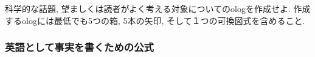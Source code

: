 \begin{exercise}

科学的な話題, 望ましくは読者がよく考える対象についてのologを作成せよ. 作成するologには最低でも5つの箱, 5本の矢印, そして１つの可換図式を含めること.
\end{exercise}


\subsubsection{英語として事実を書くための公式}


